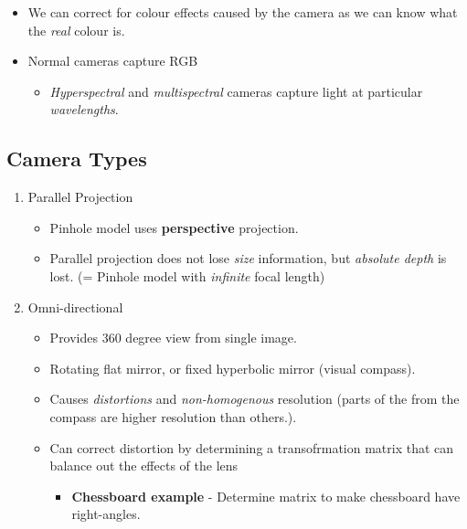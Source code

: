 \documentclass[english, 10pt]{article}
\begin{document}
\begin{itemize}
\itemsep1pt\parskip0pt
\item
  We can correct for colour effects caused by the camera as we can know
  what the \emph{real} colour is.
\item
  Normal cameras capture RGB

  \begin{itemize}
  \itemsep1pt\parskip0pt
  \item
    \emph{Hyperspectral} and \emph{multispectral} cameras capture light
    at particular \emph{wavelengths}.
  \end{itemize}
\end{itemize}

\subsection{Camera Types}\label{camera-types}

\begin{enumerate}
\def\labelenumi{\arabic{enumi}.}
\itemsep1pt\parskip0pt
\item
  Parallel Projection

  \begin{itemize}
  \itemsep1pt\parskip0pt
  \item
    Pinhole model uses \textbf{perspective} projection.
  \item
    Parallel projection does not lose \emph{size} information, but
    \emph{absolute depth} is lost. (= Pinhole model with \emph{infinite}
    focal length)
  \end{itemize}
\item
  Omni-directional

  \begin{itemize}
  \itemsep1pt\parskip0pt
  \item
    Provides 360 degree view from single image.
  \item
    Rotating flat mirror, or fixed hyperbolic mirror (visual compass).
  \item
    Causes \emph{distortions} and \emph{non-homogenous} resolution
    (parts of the from the compass are higher resolution than others.).
  \item
    Can correct distortion by determining a transofrmation matrix that
    can balance out the effects of the lens

    \begin{itemize}
    \itemsep1pt\parskip0pt
    \item
      \textbf{Chessboard example} - Determine matrix to make chessboard
      have right-angles.
    \end{itemize}
  \end{itemize}
\end{enumerate}
\end{document}
